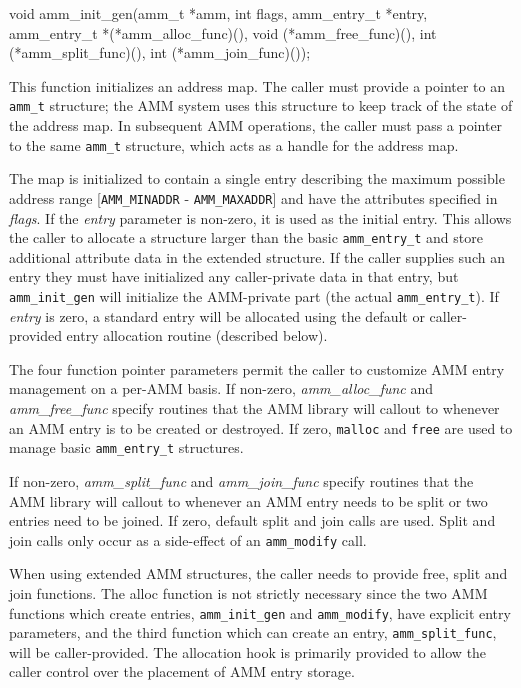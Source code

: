 \begin{apisyn}

	\funcproto void amm_init_gen(amm_t *amm, int flags, amm_entry_t *entry,
		amm_entry_t *(*amm_alloc_func)(), void (*amm_free_func)(),
		int (*amm_split_func)(), int (*amm_join_func)());
\end{apisyn}
\begin{apidesc}
	This function initializes an address map.
	The caller must provide a pointer to an {\tt amm_t} structure;
	the AMM system uses this structure to keep track
	of the state of the address map.
	In subsequent AMM operations,
	the caller must pass a pointer to the same {\tt amm_t} structure,
	which acts as a handle for the address map.

	The map is initialized to contain a single entry describing the
	maximum possible address range [{\tt AMM_MINADDR} - {\tt AMM_MAXADDR}]
	and have the attributes specified in \emph{flags}.
	If the \emph{entry} parameter is non-zero,
	it is used as the initial entry.
	This allows the caller to allocate a structure larger than the
	basic {\tt amm_entry_t} and store additional attribute data in
	the extended structure.
	If the caller supplies such an entry
	they must have initialized any caller-private data in that entry,
	but {\tt amm_init_gen} will initialize the AMM-private part
	(the actual {\tt amm_entry_t}).
	If \emph{entry} is zero, a standard entry will be allocated using
	the default or caller-provided entry allocation routine
	(described below).

	The four function pointer parameters permit the caller to
	customize AMM entry management on a per-AMM basis.
	If non-zero,
	\emph{amm_alloc_func} and \emph{amm_free_func} specify routines that
	the AMM library will callout to whenever an AMM entry is to be
	created or destroyed.
	If zero,
	{\tt malloc} and {\tt free} are used to manage basic {\tt amm_entry_t}
	structures.

	If non-zero,
	\emph{amm_split_func} and \emph{amm_join_func} specify routines that
	the AMM library will callout to whenever an AMM entry needs to be
	split or two entries need to be joined.
	If zero,
	default split and join calls are used.
	Split and join calls only occur as a side-effect of an
	{\tt amm_modify} call.

	When using extended AMM structures,
	the caller needs to provide free, split and join functions.
	The alloc function is not strictly necessary since the two AMM
	functions which create entries,
	{\tt amm_init_gen} and {\tt amm_modify},
	have explicit entry parameters,
	and the third function which can create an entry,
	{\tt amm_split_func},
	will be caller-provided.
	The allocation hook is primarily provided to allow the caller
	control over the placement of AMM entry storage.
\end{apidesc}
